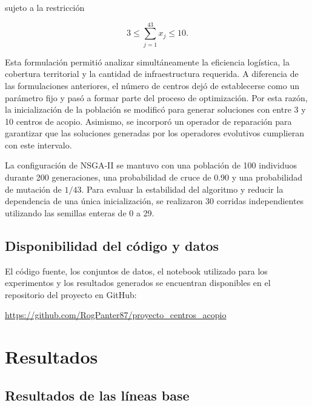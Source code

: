 \documentclass[journal]{IEEEtran}
\begin{document}
sujeto a la restricción

\begin{equation}
	3 \leq \sum_{j=1}^{43}x_j \leq 10.
\end{equation}

Esta formulación permitió analizar simultáneamente la eficiencia logística, la cobertura territorial y la cantidad de infraestructura requerida. A diferencia de las formulaciones anteriores, el número de centros dejó de establecerse como un parámetro fijo y pasó a formar parte del proceso de optimización. Por esta razón, la inicialización de la población se modificó para generar soluciones con entre 3 y 10 centros de acopio. Asimismo, se incorporó un operador de reparación para garantizar que las soluciones generadas por los operadores evolutivos cumplieran con este intervalo.

La configuración de NSGA-II se mantuvo con una población de 100 individuos durante 200 generaciones, una probabilidad de cruce de 0.90 y una probabilidad de mutación de $1/43$. Para evaluar la estabilidad del algoritmo y reducir la dependencia de una única inicialización, se realizaron 30 corridas independientes utilizando las semillas enteras de 0 a 29.

\subsection{Disponibilidad del código y datos}

El código fuente, los conjuntos de datos, el notebook utilizado para los experimentos y los resultados generados se encuentran disponibles en el repositorio del proyecto en GitHub:

\begin{center}
	\url{https://github.com/RogPanter87/proyecto_centros_acopio}
\end{center}


\section{Resultados}


\subsection{Resultados de las líneas base}
\end{document}

